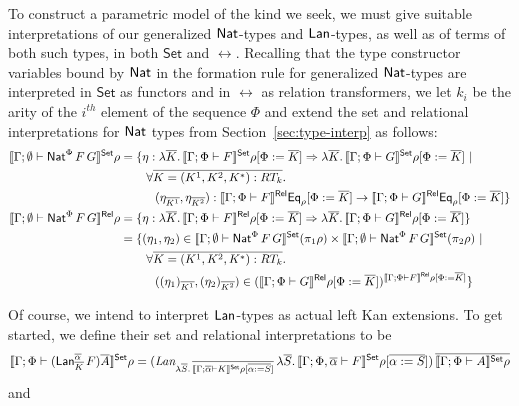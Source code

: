 \documentclass{lmcs}
\theoremstyle{plain}\newtheorem{satz}[thm]{Satz}
\newcommand{\set}{\mathsf{Set}}
\begin{document}
To construct a parametric model of the kind we seek, we must give
suitable interpretations of our generalized $\mathsf{Nat}$-types and
$\mathsf{Lan}$-types, as well as of terms of both such types, in both $\set$
and $\rel$. Recalling that the type constructor variables bound by
$\mathsf{Nat}$ in the formation rule for generalized $\mathsf{Nat}$-types are
interpreted in $\set$ as functors and in $\rel$ as relation
transformers, we let $k_i$ be the arity of the $i^{th}$ element of the
sequence $\Phi$ and extend the set and relational interpretations for
$\mathsf{Nat}$ types from Section~\ref{sec:type-interp} as follows:
\begin{align*}
\setsem{\Gamma; \emptyset \vdash \Nat^\Phi\,F\,G}\rho
&= \{\eta : \lambda \ol{K}. \,\setsem{\Gamma; \Phi \vdash F}\rho[\Phi := \ol{K}] 
  \Rightarrow \lambda \ol{K}.\,\setsem{\Gamma; \Phi \vdash G}\rho[\Phi := \ol{K}]~|~\\ 
&\hspace{0.3in} \forall \ol{K = (K^1, K^2, K^*) : RT_k}.\\
&\hspace{0.4in} (\eta_{\overline{K^1}}, \eta_{\overline{K^2}})
: \relsem{\Gamma; \Phi \vdash F}\Eq_{\rho}[\Phi := \ol{K}]
\rightarrow \relsem{\Gamma; \Phi \vdash G}\Eq_{\rho}[\Phi := \ol{K}] \} \\
\relsem{\Gamma; \emptyset \vdash \Nat^\Phi \,F\,G}\rho
&= \{\eta : \lambda \ol{K}.\,\relsem{\Gamma; \Phi \vdash F}\rho[\Phi := \ol{K}]
\Rightarrow \lambda \ol{K}. \,\relsem{\Gamma; \Phi \vdash G}\rho[\Phi := \ol{K}]\}\\
&=
  \{(\eta_1,\eta_2) \in \setsem{\Gamma; \emptyset
    \vdash \Nat^\Phi
    \,F\,G} (\pi_1 \rho) \times \setsem{ 
    \Gamma;\emptyset
    \vdash \Nat^\Phi \,F\,G} (\pi_2
  \rho)~|~\\
& \hspace{0.3in} \forall \ol{K = (K^1, K^2, K^*) : RT_k}.\\
& \hspace{0.4in} ((\eta_1)_{\ol{K^1}},(\eta_2)_{\ol{K^2}}) \in
  (\relsem{\Gamma; \Phi \vdash G}\rho[\Phi := \ol{K}])^{\relsem{\Gamma;\Phi\vdash F}\rho[\Phi := \ol{K}]} \}\\  
\end{align*}

Of course, we intend to interpret $\mathsf{Lan}$-types as actual left Kan
extensions. To get started, we define their set and relational
interpretations to be
\[
  \setsem{\Gamma;\Phi \vdash
    (\Lan^{\ol{\alpha}}_{\ol{K}}\,F)\ol{A}}\rho = (
  \textit{Lan}_{\lambda \ol{S}.\,\ol{\setsem{\Gamma; \ol\alpha \vdash K}
      \rho[\ol{\alpha := S}]}}\, \lambda \ol{S}.\,\setsem{\Gamma; \Phi, \ol\alpha
    \vdash F} \rho[\ol{\alpha := S}])\, \ol{\setsem{\Gamma; \Phi
      \vdash A}\rho}
\]
and 
\end{document}

